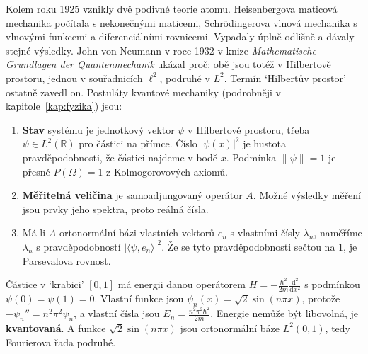 Kolem roku 1925 vznikly dvě podivné teorie atomu. Heisenbergova maticová mechanika počítala s nekonečnými maticemi, Schrödingerova vlnová mechanika s vlnovými funkcemi a diferenciálními rovnicemi. Vypadaly úplně odlišně a dávaly stejné výsledky. John von Neumann v roce 1932 v knize \textit{Mathematische Grundlagen der Quantenmechanik} ukázal proč: obě jsou totéž v Hilbertově prostoru, jednou v souřadnicích $\ell^2$, podruhé v $L^2$. Termín `Hilbertův prostor' ostatně zavedl on. Postuláty kvantové mechaniky (podrobněji v kapitole~\ref{kap:fyzika}) jsou:
\begin{enumerate}
  \item \textbf{Stav} systému je jednotkový vektor $\psi$ v Hilbertově prostoru, třeba $\psi\in L^2(\mathbb{R})$ pro částici na přímce. Číslo $|\psi(x)|^2$ je hustota pravděpodobnosti, že částici najdeme v bodě $x$. Podmínka $\|\psi\| = 1$ je přesně $P(\Omega) = 1$ z Kolmogorovových axiomů.
  \item \textbf{Měřitelná veličina} je samoadjungovaný operátor $A$. Možné výsledky měření jsou prvky jeho spektra, proto reálná čísla.
  \item Má-li $A$ ortonormální bázi vlastních vektorů $e_n$ s vlastními čísly $\lambda_n$, naměříme $\lambda_n$ s pravděpodobností $|\langle\psi, e_n\rangle|^2$. Že se tyto pravděpodobnosti sečtou na $1$, je Parsevalova rovnost.
\end{enumerate}

\begin{example}
  Částice v `krabici' $[0, 1]$ má energii danou operátorem $H = -\frac{\hbar^2}{2m}\frac{\mathrm{d}^2}{\mathrm{d}x^2}$ s podmínkou $\psi(0) = \psi(1) = 0$. Vlastní funkce jsou $\psi_n(x) = \sqrt{2}\sin(n\pi x)$, protože $-\psi_n'' = n^2\pi^2\psi_n$, a vlastní čísla jsou $E_n = \frac{n^2\pi^2\hbar^2}{2m}$. Energie nemůže být libovolná, je \textbf{kvantovaná}. A funkce $\sqrt{2}\sin(n\pi x)$ jsou ortonormální báze $L^2(0, 1)$, tedy Fourierova řada podruhé.
\end{example}

\begin{center}
\end{center}

